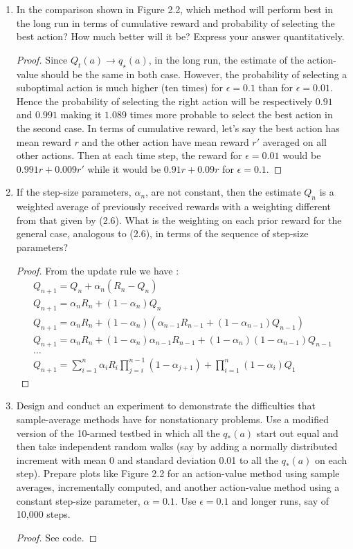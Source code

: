 \documentclass[]{book}
\theoremstyle{definition}
\newcommand{\lra}{\longrightarrow}
\begin{document}
\begin{enumerate}
    \item In the comparison shown in Figure 2.2, which method will perform best in the long run in terms of cumulative reward and probability of selecting the best action? How much better will it be? Express your answer quantitatively.
    \begin{proof}
        Since $Q_t(a) \lra q_\star(a)$, in the long run, the estimate of the action-value should be the same in both case. However, the probability of selecting a suboptimal action is much higher (ten times) for $\epsilon = 0.1$ than for $\epsilon = 0.01$. Hence the probability of selecting the right action will be respectively $0.91$ and $0.991$ making it $1.089$ times more probable to select the best action in the second case. In terms of cumulative reward, let's say the best action has mean reward $r$ and the other action have mean reward $r'$ averaged on all other actions. Then at each time step, the reward for $\epsilon = 0.01$ would be $0.991r + 0.009r'$ while it would be $0.91r + 0.09r$ for $\epsilon = 0.1$.
    \end{proof}

    \item If the step-size parameters, $\alpha_n$, are not constant, then the estimate $Q_n$ is a weighted average of previously received rewards with a weighting different from that given by (2.6). What is the weighting on each prior reward for the general case, analogous to (2.6), in terms of the sequence of step-size parameters?
    \begin{proof}
        From the update rule we have :
        \begin{align*}
            Q_{n+1} = Q_n + \alpha_n(R_n - Q_n)\\
            Q_{n+1} = \alpha_nR_n + (1-\alpha_n)Q_n\\
            Q_{n+1} = \alpha_nR_n + (1-\alpha_n)(\alpha_{n-1}R_{n-1} + (1-\alpha_{n-1})Q_{n-1})\\
            Q_{n+1} = \alpha_nR_n + (1-\alpha_n)\alpha_{n-1}R_{n-1} + (1-\alpha_n)(1-\alpha_{n-1})Q_{n-1}\\
            \ldots\\
            Q_{n+1} = \sum_{i=1}^{n}\alpha_iR_i\prod_{j=i}^{n-1}(1 - \alpha_{j+1}) + \prod_{i=1}^{n}(1-\alpha_i)Q_1
        \end{align*}
    \end{proof}
    
    \item Design and conduct an experiment to demonstrate the
    difficulties that sample-average methods have for nonstationary problems. Use a modified version of the 10-armed testbed in which all the $q_{*}(a)$ start out equal and then take independent random walks (say by adding a normally distributed increment with mean 0 and standard deviation 0.01 to all the $q_*(a)$ on each step). Prepare plots like Figure 2.2 for an action-value method using sample averages, incrementally computed, and another action-value method using a constant step-size parameter, $\alpha = 0.1$. Use $\epsilon = 0.1$ and longer runs, say of 10,000 steps.
    \begin{proof}
        See code.
    \end{proof}
\end{enumerate}
\end{document}
